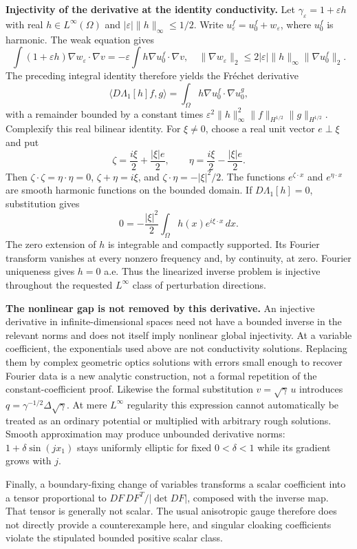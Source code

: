 \documentclass[11pt]{article}
\begin{document}
\textbf{Injectivity of the derivative at the identity conductivity.}
Let $\gamma_\varepsilon=1+\varepsilon h$ with real
$h\in L^\infty(\Omega)$ and $|\varepsilon|\|h\|_\infty\leq1/2$.
Write $u_\varepsilon^f=u_0^f+w_\varepsilon$, where $u_0^f$ is harmonic.
The weak equation gives
\[
 \int(1+\varepsilon h)\nabla w_\varepsilon\cdot\nabla v
 =-\varepsilon\int h\nabla u_0^f\cdot\nabla v,
 \quad
 \|\nabla w_\varepsilon\|_2
 \leq2|\varepsilon|\|h\|_\infty\|\nabla u_0^f\|_2.
\]
The preceding integral identity therefore yields the Fr\'echet derivative
\[
 \langle D\Lambda_1[h]f,g\rangle
 =\int_\Omega h\nabla u_0^f\cdot\nabla u_0^g,
\]
with a remainder bounded by a constant times
$\varepsilon^2\|h\|_\infty^2\|f\|_{H^{1/2}}\|g\|_{H^{1/2}}$.
Complexify this real bilinear identity.  For $\xi\ne0$, choose a real unit
vector $e\perp\xi$ and put
\[
 \zeta=\frac{i\xi}{2}+\frac{|\xi|e}{2},\qquad
 \eta=\frac{i\xi}{2}-\frac{|\xi|e}{2}.
\]
Then $\zeta\cdot\zeta=\eta\cdot\eta=0$,
$\zeta+\eta=i\xi$, and $\zeta\cdot\eta=-|\xi|^2/2$.
The functions $e^{\zeta\cdot x}$ and $e^{\eta\cdot x}$ are smooth harmonic
functions on the bounded domain.  If $D\Lambda_1[h]=0$, substitution gives
\[
 0=-\frac{|\xi|^2}{2}\int_\Omega h(x)e^{i\xi\cdot x}\,dx.
\]
The zero extension of $h$ is integrable and compactly supported.  Its Fourier
transform vanishes at every nonzero frequency and, by continuity, at zero.
Fourier uniqueness gives $h=0$ a.e.  Thus the linearized inverse problem is
injective throughout the requested $L^\infty$ class of perturbation directions.

\textbf{The nonlinear gap is not removed by this derivative.}
An injective derivative in infinite-dimensional spaces need not have a
bounded inverse in the relevant norms and does not itself imply nonlinear
global injectivity.  At a variable coefficient, the exponentials used above
are not conductivity solutions.  Replacing them by complex geometric optics
solutions with errors small enough to recover Fourier data is a new analytic
construction, not a formal repetition of the constant-coefficient proof.
Likewise the formal substitution $v=\sqrt\gamma\,u$ introduces
$q=\gamma^{-1/2}\Delta\sqrt\gamma$.  At mere $L^\infty$ regularity this
expression cannot automatically be treated as an ordinary potential or
multiplied with arbitrary rough solutions.  Smooth approximation may produce
unbounded derivative norms: $1+\delta\sin(jx_1)$ stays uniformly elliptic
for fixed $0<\delta<1$ while its gradient grows with $j$.

Finally, a boundary-fixing change of variables transforms a scalar coefficient
into a tensor proportional to $DF\,DF^T/|\det DF|$, composed with the inverse
map.  That tensor is generally not scalar.  The usual anisotropic gauge
therefore does not directly provide a counterexample here, and singular
cloaking coefficients violate the stipulated bounded positive scalar class.
\end{document}
